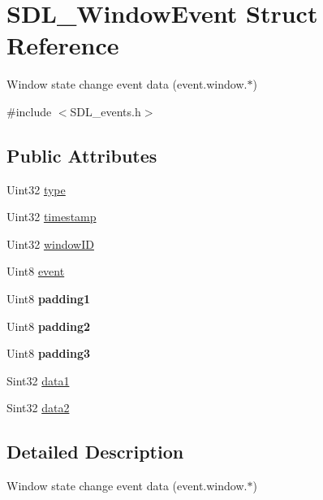 \hypertarget{structSDL__WindowEvent}{}\section{S\+D\+L\+\_\+\+Window\+Event Struct Reference}
\label{structSDL__WindowEvent}


Window state change event data (event.\+window.$\ast$)  




{\ttfamily \#include $<$S\+D\+L\+\_\+events.\+h$>$}

\subsection*{Public Attributes}
\begin{DoxyCompactItemize}
\item 
Uint32 \hyperlink{structSDL__WindowEvent_a01c8c8fbe8564e690f958d2db560f657}{type}
\item 
Uint32 \hyperlink{structSDL__WindowEvent_a7b0bf569b20cfa4e3fb76e3301d616f9}{timestamp}
\item 
Uint32 \hyperlink{structSDL__WindowEvent_a4b31796ffc84fbb7f6e9ba33e127619a}{window\+ID}
\item 
Uint8 \hyperlink{structSDL__WindowEvent_a485cd1f07f0f22fdb9f4c4bf214011dc}{event}
\item 
\mbox{\label{structSDL__WindowEvent_a09ee59114246eceed4a281033ec6609b}} 
Uint8 {\bfseries padding1}
\item 
\mbox{\label{structSDL__WindowEvent_a6bcf773b690b894e8c04c591826d0c8a}} 
Uint8 {\bfseries padding2}
\item 
\mbox{\label{structSDL__WindowEvent_ac352263b5fa4ba6dbd64a48062d5e29f}} 
Uint8 {\bfseries padding3}
\item 
Sint32 \hyperlink{structSDL__WindowEvent_a01da0025428d3434c80021f3e4089fec}{data1}
\item 
Sint32 \hyperlink{structSDL__WindowEvent_af6cd0a21bc9ecadfee42f6a0147d7171}{data2}
\end{DoxyCompactItemize}


\subsection{Detailed Description}
Window state change event data (event.\+window.$\ast$) 

